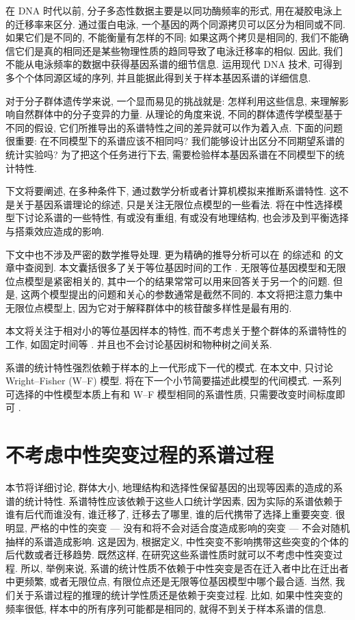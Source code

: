 \documentclass[12pt]{article}
\begin{document}
在 DNA 时代以前, 分子多态性数据主要是以同功酶频率的形式, 用在凝胶电泳上的迁移率来区分. 通过蛋白电泳,
一个基因的两个同源拷贝可以区分为相同或不同. 如果它们是不同的, 不能衡量有怎样的不同; 如果这两个拷贝是相同的,
我们不能确信它们是真的相同还是某些物理性质的趋同导致了电泳迁移率的相似. 因此,
我们不能从电泳频率的数据中获得基因系谱的细节信息. 运用现代 DNA 技术, 可得到多个个体同源区域的序列,
并且能据此得到关于样本基因系谱的详细信息.

对于分子群体遗传学来说, 一个显而易见的挑战就是: 怎样利用这些信息, 来理解影响自然群体中的分子变异的力量.
从理论的角度来说, 不同的群体遗传学模型基于不同的假设, 它们所推导出的系谱特性之间的差异就可以作为着入点.
下面的问题很重要: 在不同模型下的系谱应该不相同吗? 我们能够设计出区分不同期望系谱的统计实验吗?
为了把这个任务进行下去, 需要检验样本基因系谱在不同模型下的统计特性.

下文将要阐述, 在多种条件下, 通过数学分析或者计算机模拟来推断系谱特性. 这不是关于基因系谱理论的综述,
只是关注无限位点模型的一些看法. 将在中性选择模型下讨论系谱的一些特性, 有或没有重组, 有或没有地理结构,
也会涉及到平衡选择与搭乘效应造成的影响.

下文中也不涉及严密的数学推导处理. 更为精确的推导分析可以在 \textcite{tavare1984} 的综述和
\textcite{watterson1984} 的文章中查阅到. 本文囊括很多了关于等位基因时间的工作
\parencite{donnelly1986, donnelly1986a, tavare1989}.
无限等位基因模型和无限位点模型是紧密相关的, 其中一个的结果常常可以用来回答关于另一个的问题.
但是, 这两个模型提出的问题和关心的参数通常是截然不同的. 本文将把注意力集中无限位点模型上,
因为它对于解释群体中的核苷酸多样性是最有用的.

本文将关注于相对小的等位基因样本的特性, 而不考虑关于整个群体的系谱特性的工作, 如固定时间等
\parencite{donnelly1987, watterson1982, watterson1982b}.
并且也不会讨论基因树和物种树之间关系.

系谱的统计特性强烈依赖于样本的上一代形成下一代的模式. 在本文中, 只讨论 Wright--Fisher (W--F)
模型. 将在下一个小节简要描述此模型的代间模式. 一系列可选择的中性模型本质上有和 W--F
模型相同的系谱性质, 只需要改变时间标度即可 \parencite{watterson1975, tavare1984, ewens1990}.

\section{不考虑中性突变过程的系谱过程}

本节将详细讨论, 群体大小, 地理结构和选择性保留基因的出现等因素的造成的系谱的统计特性.
系谱特性应该依赖于这些人口统计学因素, 因为实际的系谱依赖于谁有后代而谁没有, 谁迁移了, 迁移去了哪里,
谁的后代携带了选择上重要突变. 很明显, 严格的中性的突变 --- 没有和将不会对适合度造成影响的突变 ---
不会对随机抽样的系谱造成影响. 这是因为, 根据定义, 中性突变不影响携带这些突变的个体的后代数或者迁移趋势.
既然这样, 在研究这些系谱性质时就可以不考虑中性突变过程. 所以, 举例来说,
系谱的统计性质不依赖于中性突变是否在迁入者中比在迁出者中更频繁, 或者无限位点,
有限位点还是无限等位基因模型中哪个最合适. 当然, 我们关于系谱过程的推理的统计学性质还是依赖于突变过程. 比如,
如果中性突变的频率很低, 样本中的所有序列可能都是相同的, 就得不到关于样本系谱的信息.
\end{document}
